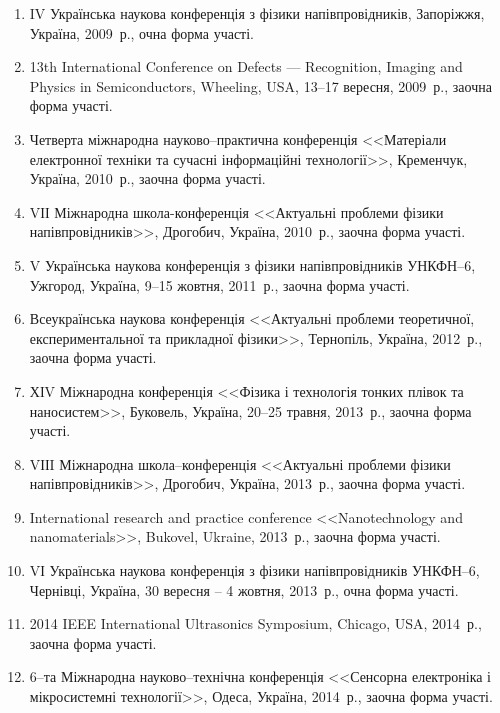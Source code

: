 \begin{enumerate}[label=\arabic*.,leftmargin=1em,itemindent=1em]
\item
IV Українська наукова конференція з фізики напівпровідників, Запоріжжя, Україна, 2009~р., очна форма участі.

\item
13th International Conference on Defects --- Recognition, Imaging and Physics in Semiconductors, Wheeling, USA, 13--17 вересня, 2009~р., заочна форма участі.

\item
Четверта міжнародна науково--практична конференція <<Матеріали електронної техніки та сучасні інформаційні технології>>, Кременчук, Україна, 2010~р., заочна форма участі.

\item
VІІ Міжнародна школа-конференція <<Актуальні проблеми фізики напівпровідників>>, Дрогобич, Україна, 2010~р., заочна форма участі.

\item
V Українська наукова конференція з фізики напівпровідників УНКФН--6, Ужгород, Україна, 9--15 жовтня, 2011~р., заочна форма участі.

\item
Всеукраїнська наукова конференція <<Актуальні проблеми теоретичної, експериментальної та прикладної фізики>>, Тернопіль, Україна, 2012~р., заочна форма участі.

\item
ХІV Міжнародна конференція <<Фізика і технологія тонких плівок та наносистем>>, Буковель, Україна, 20--25 травня, 2013~р., заочна форма участі.

\item
VІІI Міжнародна школа--конференція <<Актуальні проблеми фізики напівпровідників>>, Дрогобич, Україна, 2013~р., заочна форма участі.

\item
International research and practice conference <<Nanotechnology and nanomaterials>>, Bukovel, Ukraine, 2013~р., заочна форма участі.

\item
VІ Українська наукова конференція з фізики напівпровідників УНКФН--6, Чернівці, Україна, 30 вересня -- 4 жовтня, 2013~р., очна форма участі.

\item
2014 IEEE International Ultrasonics Symposium, Chicago, USA, 2014~р., заочна форма участі.

\item
6--та Міжнародна науково--технічна конференція <<Сенсорна електроніка і мікросистемні технології>>, Одеса, Україна, 2014~р., заочна форма участі.


\end{enumerate}
